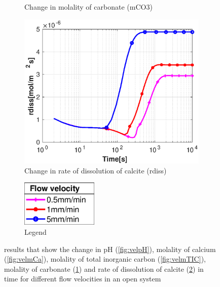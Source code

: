 \begin{figure}[!h]
\begin{subfigure}{.5\linewidth}
        \caption{Change in molality of carbonate (mCO3)}
        \label{fig:velmCO3}
    \end{subfigure}%
    \hfill
    \begin{subfigure}{.5\linewidth}
        \centering
        \includegraphics[width=\textwidth]{PICTURES/with_vel_rdiss.eps}
        \caption{Change in rate of dissolution of calcite (rdiss)}
        \label{fig:velrdiss}
    \end{subfigure}%
    \begin{subfigure}{.5\linewidth}
        \centering
        \includegraphics[width=0.40\textwidth]{PICTURES/with_vel_legend.eps}
        \caption{Legend}
        \label{fig:vellegend}
    \end{subfigure}%
    \hfill
     \caption{\DuMuX results that show the change in pH (\cref{fig:velpH}), molality of calcium (\cref{fig:velmCa}), molality of total inorganic carbon (\cref{fig:velmTIC}), molality of carbonate (\cref{fig:velmCO3}) and rate of dissolution of calcite (\cref{fig:velrdiss}) in time for different flow velocities in an open system}
     \label{fig:comparisionDiffFlowVelocity}
\end{figure}

